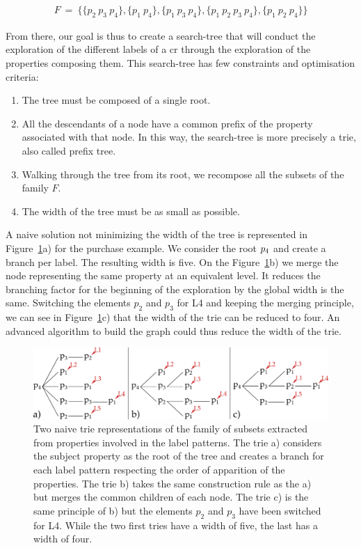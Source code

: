 \begin{align*}
 F\ =\ \{\{p_2\ p_3\ p_4\},
\{p_1\ p_4\},
\{p_1\ p_3\ p_4\},
\{p_1\ p_2\ p_3\ p_4\},
\{p_1\ p_2\ p_4\}\}
\end{align*}

From there, our goal is thus to create a search-tree that will conduct the exploration of the different labels of a \acrshort{cr} through the exploration of the properties composing them. This search-tree has few constraints and optimisation criteria:
\begin{enumerate}
	\item The tree must be composed of a single root.
	\item All the descendants of a node have a common prefix of the property associated with that node. In this way, the search-tree is more precisely a trie, also called prefix tree.
	\item Walking through the tree from its root, we recompose all the subsets of the family $F$.
	\item The width of the tree must be as small as possible.
\end{enumerate}

A naive solution not minimizing the width of the tree is represented in Figure~\ref{fig:chap7_naive}a) for the purchase example. We consider the root $p_4$ and create a branch per label. The resulting width is five. On the Figure~\ref{fig:chap7_naive}b) we merge the node representing the same property at an equivalent level. It reduces the branching factor for the beginning of the exploration by the global width is the same. Switching the elements $p_2$ and $p_3$ for L4 and keeping the merging principle, we can see in Figure~\ref{fig:chap7_naive}c) that the width of the trie can be reduced to four. An advanced algorithm to build the graph could thus reduce the width of the trie.

\begin{figure}[ht!]
\centering
\includegraphics[width=\textwidth]{figures/chapter7/naive.png}
\caption{\label{fig:chap7_naive} Two naive trie representations of the family of subsets extracted from properties involved in the label patterns. The trie a) considers the subject property as the root of the tree and creates a branch for each label pattern respecting the order of apparition of the properties. The trie b) takes the same construction rule as the a) but merges the common children of each node. The trie c) is the same principle of b) but the elements $p_2$ and $p_3$ have been switched for L4. While the two first tries have a width of five, the last has a width of four.}
\end{figure}


